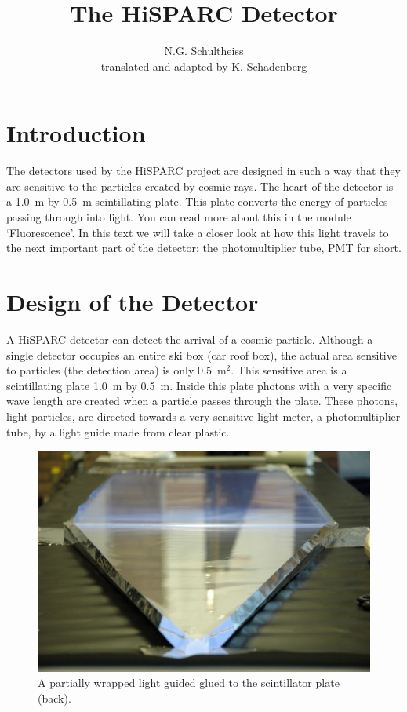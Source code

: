 \documentclass[12pt,a4paper]{article}
\author{N.G. Schultheiss \\ translated and adapted by K. Schadenberg}
\date{}
\title{The HiSPARC Detector}
\numberwithin{equation}{section}
\numberwithin{figure}{section}
\numberwithin{table}{section}
\begin{document}
\maketitle

\section{Introduction}
The detectors used by the HiSPARC project are designed in such a way that they are sensitive to the particles created by cosmic rays. The heart of the detector is a 1.0~m by 0.5~m scintillating plate. This plate converts the energy of particles passing through into light. You can read more about this in the module `Fluorescence'. In this text we will take a closer look at how this light travels to the next important part of the detector; the photomultiplier tube, PMT for short.

\section{Design of the Detector}
A HiSPARC detector can detect the arrival of a cosmic particle. Although a single detector occupies an entire ski box (car roof box), the actual area sensitive to particles (the detection area) is only 0.5~m$^2$. This sensitive area is a scintillating plate 1.0~m by 0.5~m. Inside this plate photons with a very specific wave length are created when a particle passes through the plate. These photons, light particles, are directed towards a very sensitive light meter, a photomultiplier tube, by a light guide made from clear plastic.

\begin{figure}[h]\begin{center}
\includegraphics[scale=0.19]{DSC_0081a.jpg}%
\caption{A partially wrapped light guided glued to the scintillator plate (back). }\label{fig:light_guide}
\end{center}\end{figure}
\end{document}

